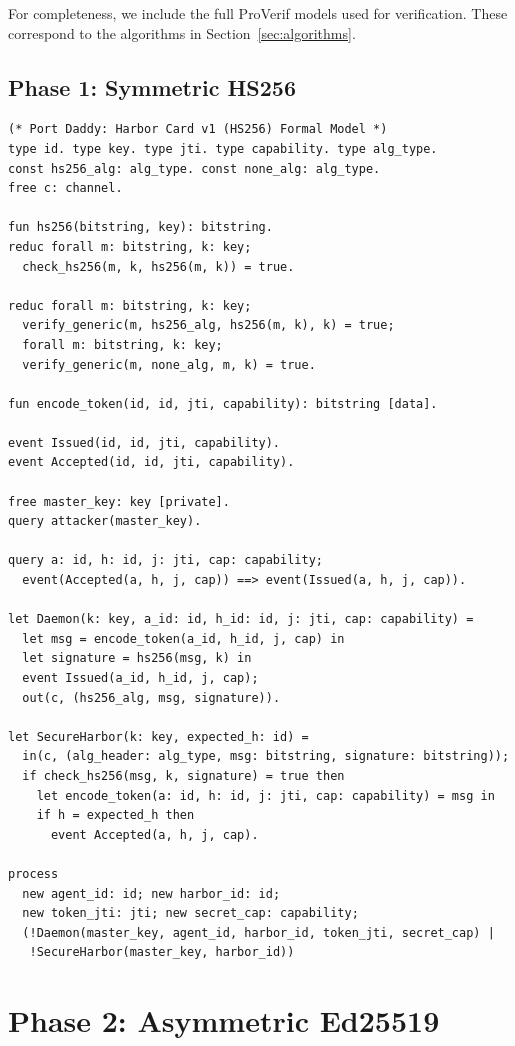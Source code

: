 \documentclass[11pt,a4paper]{article}
\theoremstyle{definition}
\begin{document}
For completeness, we include the full ProVerif models used for verification. These correspond to the algorithms in Section~\ref{sec:algorithms}.

\subsection{Phase 1: Symmetric HS256}

\begin{lstlisting}[caption={\texttt{harbor\_card\_v1\_refined.pv}}]
(* Port Daddy: Harbor Card v1 (HS256) Formal Model *)
type id. type key. type jti. type capability. type alg_type.
const hs256_alg: alg_type. const none_alg: alg_type.
free c: channel.

fun hs256(bitstring, key): bitstring.
reduc forall m: bitstring, k: key; 
  check_hs256(m, k, hs256(m, k)) = true.

reduc forall m: bitstring, k: key; 
  verify_generic(m, hs256_alg, hs256(m, k), k) = true;
  forall m: bitstring, k: key; 
  verify_generic(m, none_alg, m, k) = true.

fun encode_token(id, id, jti, capability): bitstring [data].

event Issued(id, id, jti, capability).
event Accepted(id, id, jti, capability).

free master_key: key [private].
query attacker(master_key).

query a: id, h: id, j: jti, cap: capability;
  event(Accepted(a, h, j, cap)) ==> event(Issued(a, h, j, cap)).

let Daemon(k: key, a_id: id, h_id: id, j: jti, cap: capability) =
  let msg = encode_token(a_id, h_id, j, cap) in
  let signature = hs256(msg, k) in
  event Issued(a_id, h_id, j, cap);
  out(c, (hs256_alg, msg, signature)).

let SecureHarbor(k: key, expected_h: id) =
  in(c, (alg_header: alg_type, msg: bitstring, signature: bitstring));
  if check_hs256(msg, k, signature) = true then
    let encode_token(a: id, h: id, j: jti, cap: capability) = msg in
    if h = expected_h then
      event Accepted(a, h, j, cap).

process
  new agent_id: id; new harbor_id: id;
  new token_jti: jti; new secret_cap: capability;
  (!Daemon(master_key, agent_id, harbor_id, token_jti, secret_cap) |
   !SecureHarbor(master_key, harbor_id))
\end{lstlisting}

\section{Phase 2: Asymmetric Ed25519}\label{app:phase2}
\end{document}
